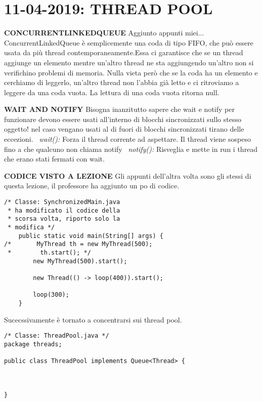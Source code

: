 

\newpage
\section{11-04-2019: THREAD POOL}
\noindent \textbf{CONCURRENTLINKEDQUEUE} \newline
Aggiunto appunti miei... ConcurrentLinkedQueue è semplicemente una coda di tipo FIFO, che può essere usata da più thread contemporaneamente.Essa ci garantisce che se un thread aggiunge un elemento mentre un'altro thread ne sta aggiungendo un'altro non si verifichino problemi di memoria. Nulla vieta però che se la coda ha un elemento e cerchiamo di leggerlo, un'altro thread non l'abbia già letto e ci ritroviamo a leggere da una coda vuota. La lettura di una coda vuota ritorna null.

\noindent \textbf{WAIT AND NOTIFY} \newline
Bisogna inanzitutto sapere che wait e notify per funzionare devono essere usati all'interno di blocchi sincronizzati sullo stesso oggetto! nel caso vengano usati al di fuori di blocchi sincronizzati tirano delle eccezioni. \newline
\textbullet\ \textit{wait():} Forza il thread corrente ad aspettare. Il thread viene sospeso fino a che qualcuno non chiama notify \newline
\textbullet\ \textit{notify():} Risveglia e mette in run i thread che erano stati fermati con wait.

\noindent \textbf{CODICE VISTO A LEZIONE} \newline
\noindent Gli appunti dell'altra volta sono gli stessi di questa lezione, il professore ha aggiunto un po di codice.
 


\begin{lstlisting}[basicstyle=\small,]
/* Classe: SynchronizedMain.java 
 * ha modificato il codice della 
 * scorsa volta, riporto solo la
 * modifica */
    public static void main(String[] args) {
/*       MyThread th = new MyThread(500);
 *        th.start(); */
        new MyThread(500).start();

        new Thread(() -> loop(400)).start();

        loop(300);
    }
\end{lstlisting}

\noindent Sucecssivamente è tornato a concentrarsi sui thread pool.

\begin{lstlisting}[basicstyle=\small,]
/* Classe: ThreadPool.java */
package threads;

public class ThreadPool implements Queue<Thread> {



}

\end{lstlisting}

